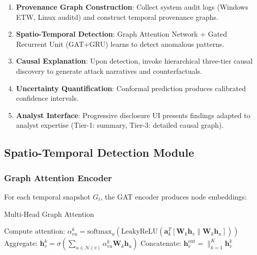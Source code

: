 \documentclass[conference]{IEEEtran}
\begin{document}
\begin{enumerate}
    \item \textbf{Provenance Graph Construction}: Collect system audit logs (Windows ETW, Linux auditd) and construct temporal provenance graphs.
    
    \item \textbf{Spatio-Temporal Detection}: Graph Attention Network + Gated Recurrent Unit (GAT+GRU) learns to detect anomalous patterns.
    
    \item \textbf{Causal Explanation}: Upon detection, invoke hierarchical three-tier causal discovery to generate attack narratives and counterfactuals.
    
    \item \textbf{Uncertainty Quantification}: Conformal prediction produces calibrated confidence intervals.
    
    \item \textbf{Analyst Interface}: Progressive disclosure UI presents findings adapted to analyst expertise (Tier-1: summary, Tier-3: detailed causal graph).
\end{enumerate}

\subsection{Spatio-Temporal Detection Module}

\subsubsection{Graph Attention Encoder}

For each temporal snapshot $G_t$, the GAT encoder produces node embeddings:

\begin{algorithm}
\caption{Multi-Head Graph Attention}
\begin{algorithmic}[1]
        \STATE Compute attention: $\alpha_{vu}^k = \text{softmax}_u\left(\text{LeakyReLU}\left(\mathbf{a}_k^T [\mathbf{W}_k \mathbf{h}_v \| \mathbf{W}_k \mathbf{h}_u]\right)\right)$
        \STATE Aggregate: $\mathbf{h}_v^{k} = \sigma\left(\sum_{u \in \mathcal{N}(v)} \alpha_{vu}^k \mathbf{W}_k \mathbf{h}_u\right)$
    \ENDFOR
\ENDFOR
\STATE Concatenate: $\mathbf{h}_v^{\text{out}} = \|_{k=1}^K \mathbf{h}_v^k$
\end{algorithmic}
\end{algorithm}
\end{document}
